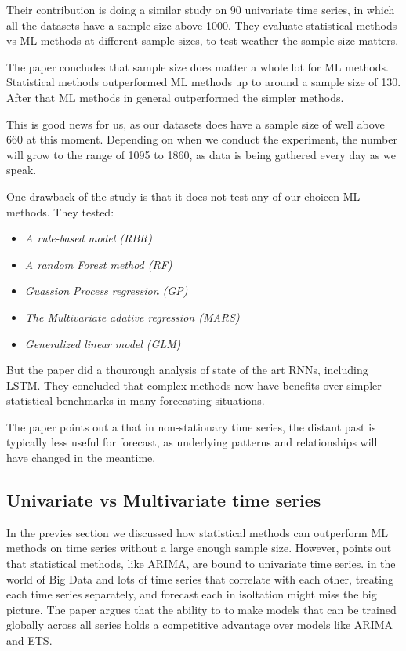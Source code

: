 Their contribution is doing a similar study on 90 univariate time series, in which 
all the datasets have a sample size above 1000. They evaluate statistical methods vs ML methods
at different sample sizes, to test weather the sample size matters.

The paper \cite{Cerqueira2019} concludes that sample size does matter a whole lot for ML methods.
Statistical methods outperformed ML methods up to around a sample size of 130. After that ML methods
in general outperformed the simpler methods.

This is good news for us, as our datasets does have a sample size of well above 660 at this moment.
Depending on when we conduct the experiment, the number will grow to the range of 1095 to 1860,
as data is being gathered every day as we speak.

One drawback of the \cite{Makridakis2018} study is that it does not test any of our choicen ML methods.
They tested:
\begin{itemize}
  \item \textit{A rule-based model (RBR)}
  \item \textit{A random Forest method (RF)}
  \item \textit{Guassion Process regression (GP)}
  \item \textit{The Multivariate adative regression (MARS)}
  \item \textit{Generalized linear model (GLM)}
\end{itemize}
But the paper \cite{Hewamalage2021} did a thourough analysis of state of the art RNNs, including LSTM.
They concluded that complex methods now have benefits over simpler statistical benchmarks in many forecasting situations.


The paper \citet{Bandara2017} points out a that in non-stationary time series, the distant past is typically less
useful for forecast, as underlying patterns and relationships will have changed in the meantime.


\subsection{Univariate vs Multivariate time series}
In the previes section we discussed how statistical methods can outperform ML methods on
time series without a large enough sample size.
However, \cite{Bandara2017} points out that statistical methods, like ARIMA, are bound to
univariate time series. in the world of Big Data and lots of time series that correlate with each other,
treating each time series separately, and forecast each in isoltation might miss the big picture.
The paper argues that the ability to to make models that can be trained globally across all series
holds a competitive advantage over models like ARIMA and ETS.

